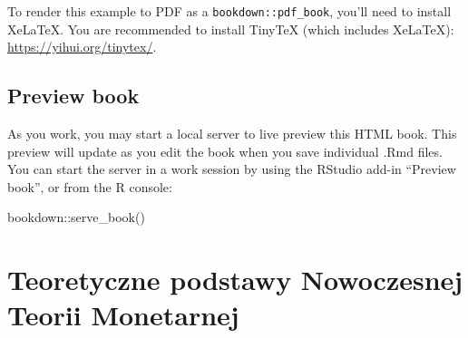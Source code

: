 \documentclass[
]{book}
\newenvironment{Shaded}{\begin{snugshade}}{\end{snugshade}}
\newcommand{\FunctionTok}[1]{\textcolor[rgb]{0.00,0.00,0.00}{#1}}
\newcommand{\NormalTok}[1]{#1}
\newcommand{\SpecialCharTok}[1]{\textcolor[rgb]{0.00,0.00,0.00}{#1}}
\begin{document}
To render this example to PDF as a \texttt{bookdown::pdf\_book}, you'll need to install XeLaTeX. You are recommended to install TinyTeX (which includes XeLaTeX): \url{https://yihui.org/tinytex/}.

\hypertarget{preview-book}{%
\section{Preview book}\label{preview-book}}

As you work, you may start a local server to live preview this HTML book. This preview will update as you edit the book when you save individual .Rmd files. You can start the server in a work session by using the RStudio add-in ``Preview book'', or from the R console:

\begin{Shaded}
\begin{Highlighting}[]
\NormalTok{bookdown}\SpecialCharTok{::}\FunctionTok{serve\_book}\NormalTok{()}
\end{Highlighting}
\end{Shaded}

\hypertarget{teoretyczne-podstawy-nowoczesnej-teorii-monetarnej}{%
\chapter{Teoretyczne podstawy Nowoczesnej Teorii Monetarnej}\label{teoretyczne-podstawy-nowoczesnej-teorii-monetarnej}}
\end{document}
